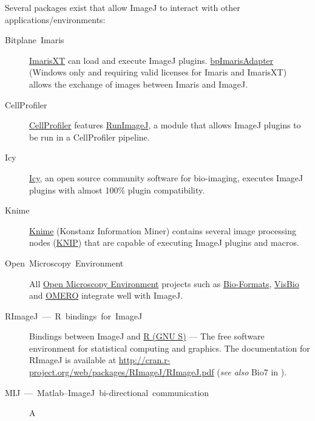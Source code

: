Several packages exist that allow ImageJ to interact
with other applications/environments:
\begin{description}
\item [{Bitplane\ Imaris}] \href{http://www.bitplane.com/go/products/imarisxt}{ImarisXT}
can load and execute ImageJ plugins. \href{http://www.bitplane.com/go/products/imarisxt/xtensions/imagej}{bpImarisAdapter}
(Windows only and requiring valid licenses for Imaris and ImarisXT)
allows the exchange of images between Imaris and ImageJ.
\item [{CellProfiler}] \href{http://www.cellprofiler.org/}{CellProfiler}
\cite{Carpenter:2006p1986} features \href{http://cellprofiler.org/CPmanual/RunImageJ.html}{RunImageJ},
a module that allows ImageJ plugins to be run in a CellProfiler pipeline.
\item [{Icy}] \href{http://www.bioimageanalysis.org/icy/}{Icy}, an open
source community software for bio-imaging, executes ImageJ
plugins with almost 100\% plugin compatibility. 
\item [{Knime}]  \href{http://knime.org/}{Knime} (Konstanz
Information Miner) contains several image processing nodes (\href{http://tech.knime.org/community/image-processing}{KNIP})
that are capable of executing ImageJ plugins and macros.
\item [{Open\ Microscopy\ Environment}] All
\href{http://www.openmicroscopy.org/}{Open Microscopy Environment}
projects such as \href{http://www.openmicroscopy.org/site/products/bio-formats}{Bio-Formats},
\href{http://www.openmicroscopy.org/site/products/visbio}{VisBio}
and \href{http://www.openmicroscopy.org/site/products/omero}{OMERO}
integrate well with ImageJ.
\item [{RImageJ\ ---\ R\ bindings\ for\ ImageJ}] Bindings between
ImageJ and \href{http://www.r-project.org/}{R (GNU S)}
--- The free software environment for statistical computing and graphics.
The documentation for RImageJ is available at \url{http://cran.r-project.org/web/packages/RImageJ/RImageJ.pdf}
(\emph{see also} Bio7 in ).
\item [{MIJ\ ---\ Matlab--ImageJ\ bi-directional\ communication}] A

\end{description}

